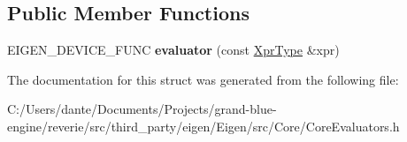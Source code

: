 \subsection*{Public Member Functions}
\begin{DoxyCompactItemize}
\item 
\mbox{\label{struct_eigen_1_1internal_1_1evaluator_3_01_cwise_ternary_op_3_01_ternary_op_00_01_arg1_00_01_arg2_00_01_arg3_01_4_01_4_aae67591bca298a4597b9965a83df5606}} 
E\+I\+G\+E\+N\+\_\+\+D\+E\+V\+I\+C\+E\+\_\+\+F\+U\+NC {\bfseries evaluator} (const \mbox{\hyperlink{class_eigen_1_1_cwise_ternary_op}{Xpr\+Type}} \&xpr)
\end{DoxyCompactItemize}


The documentation for this struct was generated from the following file\+:\begin{DoxyCompactItemize}
\item 
C\+:/\+Users/dante/\+Documents/\+Projects/grand-\/blue-\/engine/reverie/src/third\+\_\+party/eigen/\+Eigen/src/\+Core/Core\+Evaluators.\+h\end{DoxyCompactItemize}
